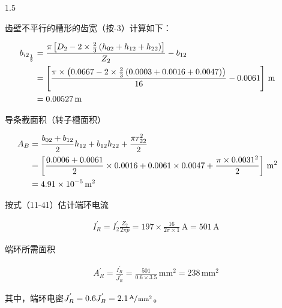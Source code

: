 \documentclass[a4paper,11pt]{ctexart}
\newcommand{\A}{\,\text{A}}
\newcommand{\m}{\,\text{m}}
\newcommand{\mm}{\,\text{mm}}
\newenvironment{shrinkeq}[2]
{
	\bgroup
	\addtolength\abovedisplayshortskip{#1}
	\addtolength\abovedisplayskip{#1}
	\addtolength\belowdisplayshortskip{#2}
	\addtolength\belowdisplayskip{#2}
}
{
	\egroup
	\ignorespacesafterend
}
\begin{document}
\begin{spacing}{1.5}
\par
齿壁不平行的槽形的齿宽（按-3）计算如下：
\begin{shrinkeq}{-1.5ex}{-1.5ex}
	\begin{align}
	b_{i2_{\frac{1}{8}}} &= \frac{\pi\left[D_2-2\times\frac{2}{3}\left(h_{02}+h_{12}+h_{22}\right)\right]}{Z_2}-b_{12} \\
	&=\left[\frac{\pi\times\left(0.0667 - 2\times\frac{2}{3}\left(0.0003+0.0016+0.0047\right)  \right)}{16}-0.0061 \right]\m\hspace{2em}\notag\\ 
	&= 0.00527\m \notag
	\end{align}
\end{shrinkeq}
导条截面积（转子槽面积）
\begin{shrinkeq}{-1.5ex}{-1.5ex}
	\begin{align}
	A_{B} &= \frac{b_{02}+b_{12}}{2}h_{12}+b_{12}h_{22}+\frac{\pi r_{22}^{2}}{2} \\
	&=\left[\frac{0.0006+0.0061}{2}\times 0.0016 +0.0061 \times 0.0047 +
	\frac{\pi\times 0.0031^2}{2}\right]\m^2 \hspace{2em}\notag\\
	&= 4.91\times 10^{-5}\m^2\notag
	\end{align}
\end{shrinkeq}
\par
按式（11-41）估计端环电流
\begin{shrinkeq}{-1.5ex}{-1.5ex}
	\begin{align}
	I_{R}^{'}=I_{2}^{'}\frac{Z_2}{2\pi p} = 197\times \frac{16}{2\pi\times 1}\A = 501\A
	\end{align}
\end{shrinkeq}
\par
端环所需面积
\begin{shrinkeq}{-1.5ex}{-1ex}
	\begin{align}
	A_{R}^{'} = \frac{I_{R}^{'}}{J_{R}^{'}} = \frac{501}{0.6\times 3.5}\mm^2 = 238\mm^2
	\end{align}
\end{shrinkeq}
其中，端环电密$J_{R}^{'} = 0.6 J_{B}^{'} =2.1 \sfrac{\A}{\mm^2}$。

\setcounter{equation}{0}

\end{spacing}
\end{document}
